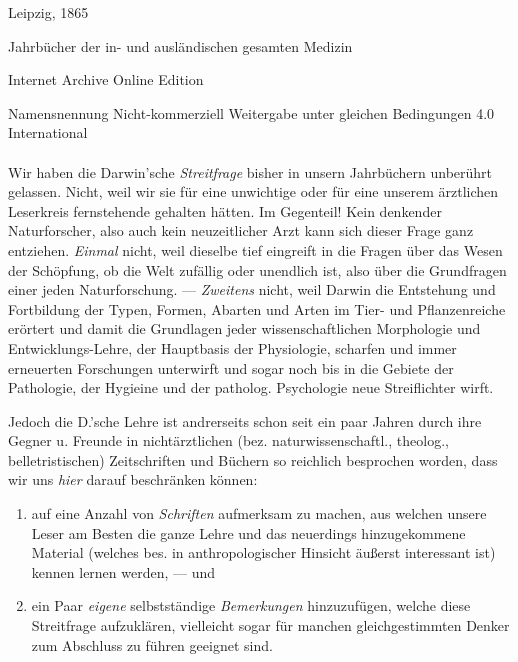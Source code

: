 \documentclass[a4paper, 11pt, oneside, english]{article}
\begin{document}
\begin{titlepage}
	\vspace*{\fill}%
	

	{Leipzig, 1865} %
 
        {\small Jahrbücher der in- und ausländischen gesamten Medizin}

	\vspace{1\baselineskip} %

    Internet Archive Online Edition  %
	
	{\small Namensnennung Nicht-kommerziell Weitergabe unter gleichen Bedingungen 4.0 International } %
\end{titlepage}
\clearpage
\Large
\setlength{\parskip}{1mm plus1mm minus1mm}
\paragraph{}
Wir haben die Darwin'sche \emph{Streitfrage} bisher in unsern Jahrbüchern unberührt gelassen. Nicht, weil wir sie für eine unwichtige oder für eine unserem ärztlichen Leserkreis fernstehende gehalten hätten. Im Gegenteil! Kein denkender Naturforscher, also auch kein neuzeitlicher Arzt kann sich dieser Frage ganz entziehen. \emph{Einmal} nicht, weil dieselbe tief eingreift in die Fragen über das Wesen der Schöpfung, ob die Welt zufällig oder unendlich ist, also über die Grundfragen einer jeden Naturforschung. --- \emph{Zweitens} nicht, weil Darwin die Entstehung und Fortbildung der Typen, Formen, Abarten und Arten im Tier- und Pflanzenreiche erörtert und damit die Grundlagen jeder wissenschaftlichen Morphologie und Entwicklungs-Lehre, der Hauptbasis der Physiologie, scharfen und immer erneuerten Forschungen unterwirft und sogar noch bis in die Gebiete der Pathologie, der Hygieine und der patholog. Psychologie neue Streiflichter wirft.

Jedoch die D.'sche Lehre ist andrerseits schon seit ein paar Jahren durch ihre Gegner u. Freunde in nichtärztlichen (bez. naturwissenschaftl., theolog., belletristischen) Zeitschriften und Büchern so reichlich besprochen worden, dass wir uns \emph{hier} darauf beschränken können:
\begin{enumerate}
    \item auf eine Anzahl von \emph{Schriften} aufmerksam zu machen, aus welchen unsere Leser am Besten die ganze Lehre und das neuerdings hinzugekommene Material (welches bes. in anthropologischer Hinsicht äußerst interessant ist) kennen lernen werden, --- und

    \item ein Paar \emph{eigene} selbstständige \emph{Bemerkungen} hinzuzufügen, welche diese Streitfrage aufzuklären, vielleicht sogar für manchen gleichgestimmten Denker zum Abschluss zu führen geeignet sind.
\end{enumerate}
\end{document}
